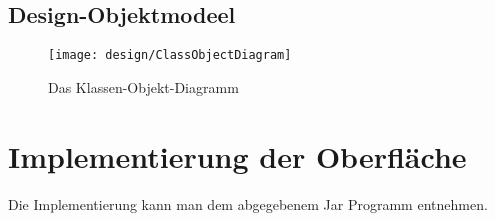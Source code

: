 \subsection{Design-Objektmodeel}
\begin{figure}[h]
  \begin{center}
    \texttt{[image: design/ClassObjectDiagram]}
    \caption{Das Klassen-Objekt-Diagramm}
  \end{center}
\end{figure}
\newpage

\section{Implementierung der Oberfläche}
Die Implementierung kann man dem abgegebenem Jar Programm entnehmen.
